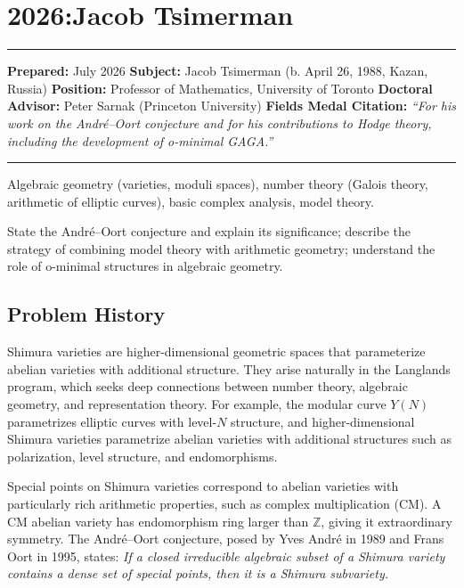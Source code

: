 \chapter{2026:Jacob Tsimerman}\label{ch2026jacobtsimerman:jacob-tsimerman-fields-medal-2026}

\begin{center}\rule{0.5\linewidth}{0.5pt}\end{center}

\textbf{Prepared:} July 2026 \textbf{Subject:} Jacob Tsimerman (b. April 26, 1988, Kazan, Russia) \textbf{Position:} Professor of Mathematics, University of Toronto \textbf{Doctoral Advisor:} Peter Sarnak (Princeton University) \textbf{Fields Medal Citation:} \emph{``For his work on the Andr\'{e}--Oort conjecture and for his contributions to Hodge theory, including the development of o-minimal GAGA.''}

\begin{center}\rule{0.5\linewidth}{0.5pt}\end{center}

\begin{prereqs} Algebraic geometry (varieties, moduli spaces), number theory (Galois theory, arithmetic of elliptic curves), basic complex analysis, model theory. \end{prereqs}

\begin{objectives} State the Andr\'{e}--Oort conjecture and explain its significance; describe the strategy of combining model theory with arithmetic geometry; understand the role of o-minimal structures in algebraic geometry. \end{objectives}

\section{Problem History}

Shimura varieties are higher-dimensional geometric spaces that parameterize abelian varieties with additional structure. They arise naturally in the Langlands program, which seeks deep connections between number theory, algebraic geometry, and representation theory. For example, the modular curve $Y(N)$ parametrizes elliptic curves with level-$N$ structure, and higher-dimensional Shimura varieties parametrize abelian varieties with additional structures such as polarization, level structure, and endomorphisms.

Special points on Shimura varieties correspond to abelian varieties with particularly rich arithmetic properties, such as complex multiplication (CM). A CM abelian variety has endomorphism ring larger than $\mathbb{Z}$, giving it extraordinary symmetry. The Andr\'{e}--Oort conjecture, posed by Yves Andr\'{e} in 1989 and Frans Oort in 1995, states: \emph{If a closed irreducible algebraic subset of a Shimura variety contains a dense set of special points, then it is a Shimura subvariety.}

